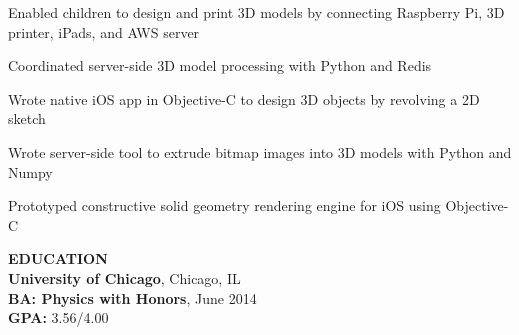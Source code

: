 \begin{tightlist}

\item Enabled children to design and print 3D models by connecting Raspberry Pi, 3D printer, iPads, and AWS server

\item Coordinated server-side 3D model processing with Python and Redis

\item Wrote native iOS app in Objective-C to design 3D objects by revolving a 2D sketch

\item Wrote server-side tool to extrude bitmap images into 3D models with Python and Numpy

\item Prototyped constructive solid geometry rendering engine for iOS using Objective-C\\

\end{tightlist}

\noindent\textbf{EDUCATION} \\
\textbf{University of Chicago}, Chicago, IL \\
\textbf{BA: Physics with Honors}, June 2014 \\
\textbf{GPA:} 3.56/4.00 \\\\

